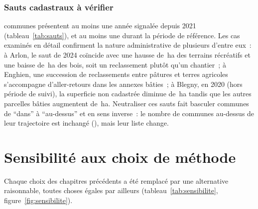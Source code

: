 \documentclass[11pt,a4paper]{report}
\newcommand{\ha}{\,ha}
\begin{document}
\begin{table}[ht]
\centering\footnotesize
\caption{Communes contribuant le plus à l'écart, en hectares cumulés \AnneeDebutObs-\AnneeFinObs{} (trajectoire communale théorique). Ratio neutralisé~: après remplacement des années signalées par la médiane communale.}
\label{tab:contributeurs}

\end{table}

\subsection{Sauts cadastraux à vérifier}
\label{sec:sauts}
\NbSautsSuivi{} communes présentent au moins une année signalée depuis 2021 (tableau~\ref{tab:sauts}), et \NbSautsRef{} au moins une durant la période de référence. Les cas examinés en détail confirment la nature administrative de plusieurs d'entre eux~: à Arlon, le saut de 2024 coïncide avec une hausse de \ArlonJ\ha{} des terrains récréatifs et une baisse de \ArlonG\ha{} des bois, soit un reclassement plutôt qu'un chantier~; à Enghien, une succession de reclassements entre pâtures et terres agricoles s'accompagne d'aller-retours dans les annexes bâties~; à Blegny, en 2020 (hors période de suivi), la superficie non cadastrée diminue de \BlegnyNC\ha{} tandis que les autres parcelles bâties augmentent de \BlegnyRST\ha. Neutraliser ces sauts fait basculer \NbBasculeHaut{} communes de \enquote{dans} à \enquote{au-dessus} et \NbBasculeBas{} en sens inverse~: le nombre de communes au-dessus de leur trajectoire est inchangé (\NbAuDessusNeutre), mais leur liste change.

\begin{table}[ht]
\centering\footnotesize
\caption{Communes présentant un saut cadastral à vérifier depuis 2021 (flux de l'année signalée et médiane communale, ha).}
\label{tab:sauts}

\end{table}

\chapter{Sensibilité aux choix de méthode}
\label{ch:sens}

Chaque choix des chapitres précédents a été remplacé par une alternative raisonnable, toutes choses égales par ailleurs (tableau~\ref{tab:sensibilite}, figure~\ref{fig:sensibilite}).
\end{document}
